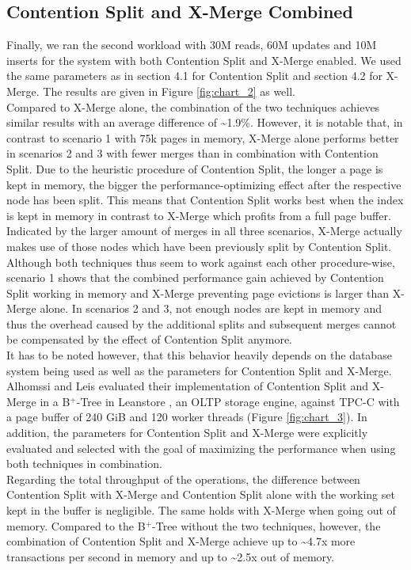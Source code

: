 \documentclass[acmlarge,nonacm,dvipsnames]{acmart}
\begin{document}
\subsection{Contention Split and X-Merge Combined}
Finally, we ran the second workload with 30M reads, 60M updates and 10M inserts for the system with both Contention Split and X-Merge enabled. We used the same parameters as in section 4.1 for Contention Split and section 4.2 for X-Merge. The results are given in Figure \ref{fig:chart_2} as well.\\
Compared to X-Merge alone, the combination of the two techniques achieves similar results with an average difference of \textasciitilde1.9\%. However, it is notable that, in contrast to scenario 1 with 75k pages in memory, X-Merge alone performs better in scenarios 2 and 3 with fewer merges than in combination with Contention Split. Due to the heuristic procedure of Contention Split, the longer a page is kept in memory, the bigger the performance-optimizing effect after the respective node has been split. This means that Contention Split works best when the index is kept in memory in contrast to X-Merge which profits from a full page buffer. Indicated by the larger amount of merges in all three scenarios, X-Merge actually makes use of those nodes which have been previously split by Contention Split.\\
Although both techniques thus seem to work against each other procedure-wise, scenario 1 shows that the combined performance gain achieved by Contention Split working in memory and X-Merge preventing page evictions is larger than X-Merge alone. In scenarios 2 and 3, not enough nodes are kept in memory and thus the overhead caused by the additional splits and subsequent merges cannot be compensated by the effect of Contention Split anymore.\\
It has to be noted however, that this behavior heavily depends on the database system being used as well as the parameters for Contention Split and X-Merge. Alhomssi and Leis evaluated their implementation of Contention Split and X-Merge in a B$^+$-Tree in Leanstore \cite{leanstore}, an OLTP storage engine, against TPC-C with a page buffer of 240 GiB and 120 worker threads (Figure \ref{fig:chart_3}). In addition, the parameters for Contention Split and X-Merge were explicitly evaluated and selected with the goal of maximizing the performance when using both techniques in combination.\\
Regarding the total throughput of the operations, the difference between Contention Split with X-Merge and Contention Split alone with the working set kept in the buffer is negligible. The same holds with X-Merge when going out of memory. Compared to the B$^+$-Tree without the two techniques, however, the combination of Contention Split and X-Merge achieve up to \textasciitilde4.7x more transactions per second in memory and up to \textasciitilde2.5x out of memory.
\end{document}
